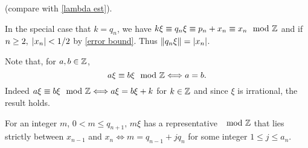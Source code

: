 \documentclass[../main.tex]{subfiles}
\begin{document}
(compare with \eqref{lambda est}).

In the special case that $k = q_{n}$, we have $k\xi \equiv q_{n}\xi \equiv p_{n} + x_{n} \equiv x_{n} \mod{\mathbb{Z}}$ and if $n \geq 2,\; \left|x_{n}\right| < 1/2$ by \eqref{error bound}. Thus $\|{q_{n}\xi}\| = \left|x_{n}\right|$.

\begin{rmk}\label{repequiv}
Note that, for $a, b \in \mathbb{Z}$, 
\[
a\xi \equiv b\xi \mod{\mathbb{Z}} \Longleftrightarrow a = b. 
\]
Indeed $a\xi \equiv b\xi \mod{\mathbb{Z}} \Longleftrightarrow a\xi = b\xi + k$ for $k \in \mathbb{Z}$ and since $\xi$ is irrational, the result holds.
\end{rmk}

\begin{lem}
For an integer $m$, $0 < m \leq q_{n+1},\, m\xi$ has a representative $ \mod{\mathbb{Z}}$ that lies strictly between $x_{n-1}$ and $x_{n} \Longleftrightarrow m = q_{n-1} + jq_{n}$ for some integer $1 \leq j \leq a_{n}$. 
\end{lem}
\end{document}

